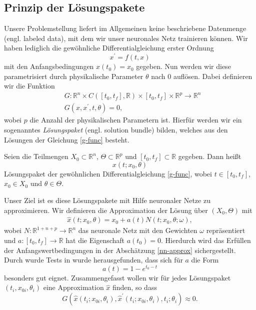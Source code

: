 \subsection{Prinzip der Lösungspakete}
\label{subsec:lsgpakete}
Unsere Problemstellung liefert im Allgemeinen keine beschriebene Datenmenge (engl. labeled data), mit dem wir unser
neuronales Netz trainieren können. Wir haben lediglich die gewöhnliche Differentialgleichung erster Ordnung
\[
    x^{\prime} = f(t,x)
\]
mit den Anfangsbedingungen $x(t_0)=x_0$ gegeben. Nun werden wir diese parametrisiert durch physikalische Parameter
$\theta$ nach $0$ auflösen. Dabei definieren wir die Funktion
\begin{align}
    \label{g-func}
    &G:\mathbb{R}^n \times C([t_0,t_f],\mathbb{R}) \times [t_0, t_f] \times \mathbb{R}^p \rightarrow \mathbb{R}^n \nonumber\\
    &G \left( x, x^{\prime}, t, \theta \right) = 0,
\end{align}
wobei $p$ die Anzahl der physikalischen Parametern ist. Hierfür werden wir ein sogenanntes \textit{Lösungspaket}
(engl. solution bundle) bilden, welches aus den Lösungen der Gleichung \eqref{g-func} besteht.
\begin{definition}
    \label{sol-bundle}
    Seien die Teilmengen $X_0 \subset \mathbb{R}^n$, $\Theta \subset \mathbb{R}^p$ und $[t_0,t_f] \subset \mathbb{R}$
    gegeben. Dann heißt
    \[
        x(t;x_0, \theta)
    \]
    Lösungspaket der gewöhnlichen Differentialgleichung \eqref{g-func}, wobei $t \in [t_0,t_f]$, $x_0 \in X_0$ und
    $\theta \in \Theta$.
\end{definition}
Unser Ziel ist es diese Lösungspakete mit Hilfe neuronaler Netze zu approximieren. Wir definieren die Approximation der
Lösung über $(X_0,\Theta)$ mit
\begin{align}
    \label{nn-approx}
    \hat{x}(t;x_0, \theta) = x_0 + a(t) N(t; x_0, \theta; \omega),
\end{align}
wobei $N:\mathbb{R}^{1+n+p} \rightarrow \mathbb{R}^n$ das neuronale Netz mit den Gewichten $\omega$ repräsentiert und
$a:[t_0,t_f] \rightarrow \mathbb{R}$ hat die Eigenschaft $a(t_0)=0$. Hierdurch wird das Erfüllen der
Anfangswertbedingungen in der Abschätzung \eqref{nn-approx} sichergestellt. Durch wurde Tests in
\cite{flamantSolvingDifferentialEquations2020} wurde herausgefunden, dass sich für $a$ die Form
\[
    a(t) = 1 - e^{t_0-t}
\]
besonders gut eignet. Zusammengefasst wollen wir für jedes Lösungspaket $(t_i,x_{0i}, \theta_i)$ eine Approximation
$\hat{x}$ finden, so dass
\[
    G(\hat{x}(t_i;x_{0i},\theta_i), \hat{x}^{\prime}(t_i;x_{0i},\theta_i),t_i;\theta_i) \approx 0.
\]
